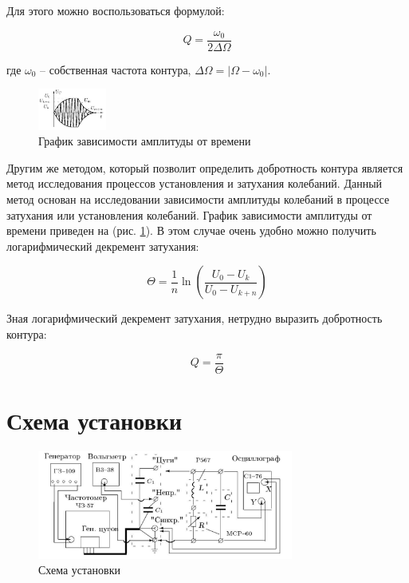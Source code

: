 \documentclass[10pt,a4paper]{article}
\begin{document}
	Для этого можно воспользоваться формулой:
	
	\begin{equation}
		Q = \frac{\omega_{0}}{2\Delta \Omega}
		\label{eq:equation_1}
	\end{equation}
	
	где $\omega_{0}$ -- собственная частота контура, $\Delta \Omega = \left|\Omega - \omega_{0} \right|$. 
	
	\begin{figure}
		\vspace{-1.5cm}
		\centering
		\includegraphics[width = 0.2\textwidth]{graph_of_depence_amplitude}
		\caption{График зависимости амплитуды от времени}
		\label{fig:graph_of_depence_amplitude}
	\end{figure}\vspace{0.5cm}
	
	Другим же методом, который позволит определить добротность контура является метод исследования процессов установления и затухания колебаний. Данный метод основан на исследовании зависимости амплитуды колебаний в процессе затухания или установления колебаний. График зависимости амплитуды от времени приведен на (рис. \ref{fig:graph_of_depence_amplitude}). В этом случае очень удобно можно получить логарифмический декремент затухания:
	
	\begin{equation}
		\Theta = \frac{1}{n}\ln \left(\frac{U_{0} - U_{k}}{U_{0} - U_{k + n}}\right)
		\label{eq:equation_2}
	\end{equation}
	
	Зная логарифмический декремент затухания, нетрудно выразить добротность контура:
	
	\begin{equation}
		Q = \frac{\pi}{\Theta}
		\label{eq:equation_3}
	\end{equation}
	
	\section{Схема установки}
	\begin{figure}[h!]	
		\begin{center}
			\includegraphics[width = 0.75\textwidth]{schem_of_facility}
			\caption{Схема установки}
			\label{fig:schem_of_facility}
		\end{center}
	\end{figure}
	
\end{document}
